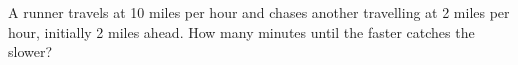 A runner travels at 10 miles per hour and chases another travelling at 2 miles per hour, initially 2 miles ahead. How many minutes until the faster catches the slower?
